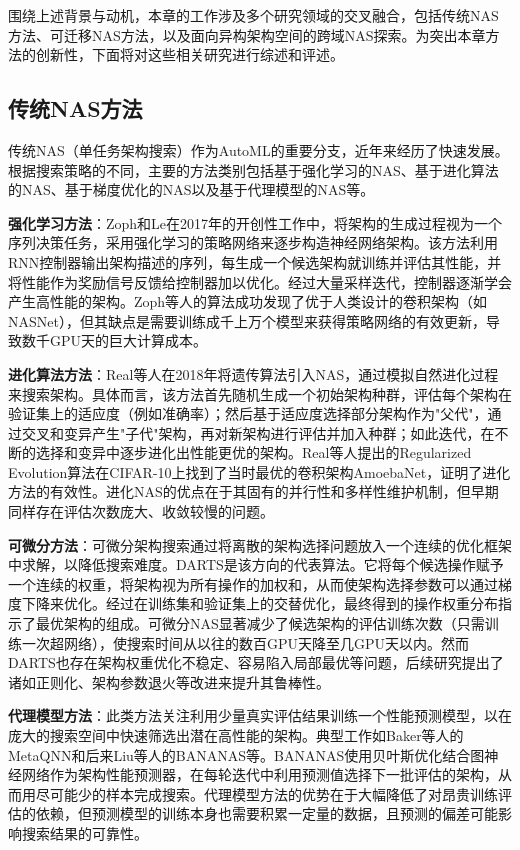 \documentclass[../main.tex]{subfiles}
\begin{document}
围绕上述背景与动机，本章的工作涉及多个研究领域的交叉融合，包括传统NAS方法、可迁移NAS方法，以及面向异构架构空间的跨域NAS探索。为突出本章方法的创新性，下面将对这些相关研究进行综述和评述。

\subsection{传统NAS方法}

传统NAS（单任务架构搜索）作为AutoML的重要分支，近年来经历了快速发展。根据搜索策略的不同，主要的方法类别包括基于强化学习的NAS、基于进化算法的NAS、基于梯度优化的NAS以及基于代理模型的NAS等。

\textbf{强化学习方法}：Zoph和Le在2017年的开创性工作中，将架构的生成过程视为一个序列决策任务，采用强化学习的策略网络来逐步构造神经网络架构。该方法利用RNN控制器输出架构描述的序列，每生成一个候选架构就训练并评估其性能，并将性能作为奖励信号反馈给控制器加以优化。经过大量采样迭代，控制器逐渐学会产生高性能的架构。Zoph等人的算法成功发现了优于人类设计的卷积架构（如NASNet），但其缺点是需要训练成千上万个模型来获得策略网络的有效更新，导致数千GPU天的巨大计算成本。

\textbf{进化算法方法}：Real等人在2018年将遗传算法引入NAS，通过模拟自然进化过程来搜索架构。具体而言，该方法首先随机生成一个初始架构种群，评估每个架构在验证集上的适应度（例如准确率）；然后基于适应度选择部分架构作为"父代"，通过交叉和变异产生"子代"架构，再对新架构进行评估并加入种群；如此迭代，在不断的选择和变异中逐步进化出性能更优的架构。Real等人提出的Regularized Evolution算法在CIFAR-10上找到了当时最优的卷积架构AmoebaNet，证明了进化方法的有效性。进化NAS的优点在于其固有的并行性和多样性维护机制，但早期同样存在评估次数庞大、收敛较慢的问题。

\textbf{可微分方法}：可微分架构搜索通过将离散的架构选择问题放入一个连续的优化框架中求解，以降低搜索难度。DARTS是该方向的代表算法。它将每个候选操作赋予一个连续的权重，将架构视为所有操作的加权和，从而使架构选择参数可以通过梯度下降来优化。经过在训练集和验证集上的交替优化，最终得到的操作权重分布指示了最优架构的组成。可微分NAS显著减少了候选架构的评估训练次数（只需训练一次超网络），使搜索时间从以往的数百GPU天降至几GPU天以内。然而DARTS也存在架构权重优化不稳定、容易陷入局部最优等问题，后续研究提出了诸如正则化、架构参数退火等改进来提升其鲁棒性。

\textbf{代理模型方法}：此类方法关注利用少量真实评估结果训练一个性能预测模型，以在庞大的搜索空间中快速筛选出潜在高性能的架构。典型工作如Baker等人的MetaQNN和后来Liu等人的BANANAS等。BANANAS使用贝叶斯优化结合图神经网络作为架构性能预测器，在每轮迭代中利用预测值选择下一批评估的架构，从而用尽可能少的样本完成搜索。代理模型方法的优势在于大幅降低了对昂贵训练评估的依赖，但预测模型的训练本身也需要积累一定量的数据，且预测的偏差可能影响搜索结果的可靠性。
\end{document}
